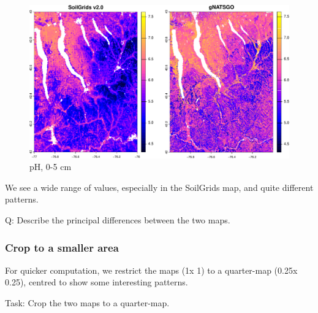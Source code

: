 \documentclass[
  letterpaper,
  DIV=11,
  numbers=noendperiod]{scrartcl}
\begin{document}
\begin{figure}[H]

{\centering \includegraphics{PatternAnalysisWorkshopTutorial_files/figure-pdf/fig-sg-gn-1.pdf}

}

\caption{\label{fig-sg-gn}pH, 0-5 cm}

\end{figure}

We see a wide range of values, especially in the SoilGrids map, and
quite different patterns.

Q: Describe the principal differences between the two maps.

\hypertarget{crop-to-a-smaller-area}{%
\subsubsection{Crop to a smaller area}\label{crop-to-a-smaller-area}}

For quicker computation, we restrict the maps (1\textdegree x
1\textdegree) to a quarter-map (0.25\textdegree x 0.25\textdegree),
centred to show some interesting patterns.

Task: Crop the two maps to a quarter-map.
\end{document}
